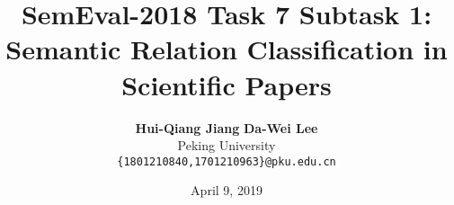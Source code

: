 \documentclass[12pt]{article}
\title{\textbf{SemEval-2018 Task 7 Subtask 1: Semantic Relation Classification in Scientific Papers}}
\author{\textbf{Hui-Qiang Jiang} \quad \textbf{Da-Wei Lee} \\
Peking University \\
{\tt \{1801210840,1701210963\}@pku.edu.cn}}
\date{April 9, 2019}
\begin{document}
\maketitle
\begin{abstract}
  
\end{abstract}

\begin{multicols}{2}







\end{multicols}







\end{document}
